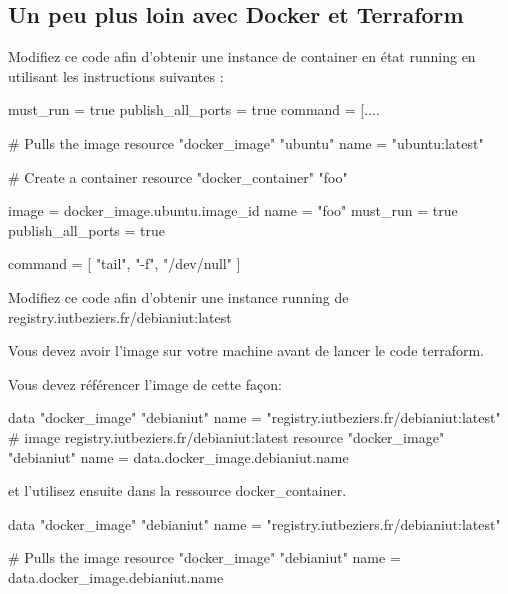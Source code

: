\subsection{Un peu plus loin avec Docker et Terraform}
\begin{questions}

\question Modifiez ce code afin d'obtenir une instance de container en état running en utilisant les instructions suivantes :
\begin{terraformcode}
must_run = true
publish_all_ports = true 
command = [.... 
\end{terraformcode}
\begin{solution}
\begin{terraformcode}

    # Pulls the image
    resource "docker_image" "ubuntu" {
      name = "ubuntu:latest"
    }
    
    # Create a container
    resource "docker_container" "foo" {
      image = docker_image.ubuntu.image_id
      name  = "foo"
      must_run          = true
      publish_all_ports = true
    
      command = [
        "tail",
        "-f",
        "/dev/null"
      ]
    }
\end{terraformcode}


\end{solution}


\question Modifiez ce code afin d'obtenir une instance running de registry.iutbeziers.fr/debianiut:latest 

Vous devez avoir l'image sur votre machine avant de lancer le code terraform.

Vous devez référencer l'image de cette façon:

\begin{terraformcode}
data "docker_image" "debianiut" {
    name = "registry.iutbeziers.fr/debianiut:latest"
  }      
# image registry.iutbeziers.fr/debianiut:latest
  resource "docker_image" "debianiut" {
  name = data.docker_image.debianiut.name
}
\end{terraformcode}
et l'utilisez ensuite dans la ressource docker\_container.

\begin{solution}
\begin{terraformcode}
    data "docker_image" "debianiut" {
        name = "registry.iutbeziers.fr/debianiut:latest"
      }
      
      # Pulls the image
      resource "docker_image" "debianiut" {
        name = data.docker_image.debianiut.name
      }
      

\end{terraformcode}
\end{solution}
\end{questions}
